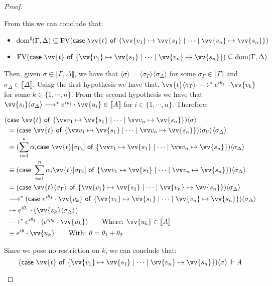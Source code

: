\documentclass[runningheads,orivec,envcountsame,envcountsect]{llncs}
\newcommand\lra{\longrightarrow}
\newcommand\ansubst[2]{\ensuremath{\langle #1 \rangle_{#2}}}
\newcommand\dom[1]{\mathrm{dom}(#1)}
\newcommand\sdom[1]{\mathrm{dom}^{\sharp}(#1)}
\newcommand\FV[1]{\mathrm{FV}(#1)}
\def\gencase#1#2#3#4#5{\ensuremath{\mathsf{case}~#1~\mathsf{of}~\{#2\mapsto #4 \mid \dotsb \mid #3\mapsto #5\}}}
\def\lraneq{\rightsquigarrow}
\def\eval{\lra^*}
\def\sem#1{\llbracket#1\rrbracket}
\def\real{\Vdash}
\begin{document}
\begin{proof}
\begin{description}
    From this we can conclude that:
    
    \begin{itemize}
        \item $\sdom{\Gamma,\Delta}\subseteq \FV{\gencase{\vv{t}}{\vv{v_1}}{\vv {v_n}}{\vv{s_1}}{\vv{s_n}}}$
        \item $\FV{\gencase{\vv{t}}{\vv{v_1}}{\vv {v_n}}{\vv{s_1}}{\vv{s_n}}}\subseteq \dom{\Gamma,\Delta}$
    \end{itemize}


    
    Then, given $\sigma\in\sem{\Gamma,\Delta}$, we have that $\ansubst{\sigma}{}=\ansubst{\sigma_\Gamma}{}\ansubst{\sigma_\Delta}{}$ for some $\sigma_\Gamma\in\sem{\Gamma}$ and $\sigma_\Delta\in\sem{\Delta}$. Using the first hypothesis we have that, $\vv{t}\ansubst{\sigma_\Gamma}{}\eval e^{i\theta_1}\cdot\vv{v_k}$ for some $k\in\{1,\dotsb ,n\}$. From the second hypothesis we have that $\vv{s_i}\ansubst{\sigma_\Delta}{}\eval e^{i\rho_i}\cdot\vv{u_i}\in\sem{A}$ for $i\in\{1,\dotsb , n\}$. Therefore:

    \begin{align*}
        (&\gencase{\vv{t}}{\vv v_1}{\vv v_n}{\vv{s_1}}{\vv{s_n}})\ansubst{\sigma}{}\\ 
        &= (\gencase{\vv{t}}{\vv v_1}{\vv v_n}{\vv{s_1}}{\vv{s_n}})\ansubst{\sigma_\Gamma}{}\ansubst{\sigma_\Delta}{}\\
        &= (\sum_{i=1}^{n}\alpha_i \gencase{\vv{t}[\sigma_{\Gamma i}]}{\vv v_1}{\vv v_n}{\vv{s_1}}{\vv{s_n}})\ansubst{\sigma_\Delta}{} \\
        &\equiv (\gencase{\sum_{i=1}^{n} \alpha_i \vv{t}[\sigma_{\Gamma i}]}{\vv v_1}{\vv v_n}{\vv{s_1}}{\vv{s_n}})\ansubst{\sigma_\Delta}{}\\
        &=(\gencase{\vv{t}\ansubst{\sigma_\Gamma}{}}{\vv{v_1}}{\vv{v_n}}{\vv{s_1}}{\vv{s_n}})\ansubst{\sigma_\Delta}{}\\
        &\eval(\gencase{e^{i\theta_1}\cdot\vv{v_k}}{\vv{v_1}}{\vv{v_n}}{\vv{s_1}}{\vv{s_n}})\ansubst{\sigma_\Delta}{}\\
        &\lraneq e^{i\theta_1}\cdot(\vv{s_k}\ansubst{\sigma_\Delta}{})\\
        &\eval e^{i\theta_1}\cdot(e^{i\rho_k}\cdot\vv{u_k})\qquad\text{Where: }\vv{u_k}\in\sem{A}\\
        &\equiv e^{i\theta}\cdot\vv{u_k}\qquad\text{With: }\theta=\theta_1 +\theta_2
    \end{align*}
    
    Since we pose no restriction on $k$, we can conclude that:
    \[(\gencase{\vv{t}}{\vv{v_1}}{\vv{v_n}}{\vv{s_1}}{\vv{s_n}})\ansubst{\sigma}{}\real A\]



\end{description}
\end{proof}
\end{document}

